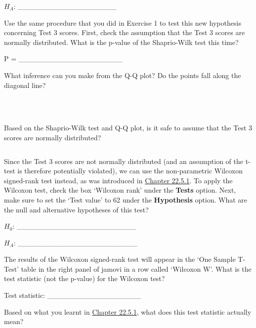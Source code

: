 \documentclass[
]{scrbook}
\begin{document}
\(H_{A}\): \_\_\_\_\_\_\_\_\_\_\_\_\_\_\_\_\_\_\_

Use the same procedure that you did in Exercise 1 to test this new hypothesis concerning Test 3 scores.
First, check the assumption that the Test 3 scores are normally distributed.
What is the p-value of the Shaprio-Wilk test this time?

P = \_\_\_\_\_\_\_\_\_\_\_\_\_\_\_\_\_\_\_\_

What inference can you make from the Q-Q plot?
Do the points fall along the diagonal line?

\begin{verbatim}



\end{verbatim}

Based on the Shaprio-Wilk test and Q-Q plot, is it safe to assume that the Test 3 scores are normally distributed?

\begin{verbatim}

\end{verbatim}

Since the Test 3 scores are not normally distributed (and an assumption of the t-test is therefore potentially violated), we can use the non-parametric Wilcoxon signed-rank test instead, as was introduced in \protect\hyperlink{wilcoxon-test}{Chapter 22.5.1}.
To apply the Wilcoxon test, check the box `Wilcoxon rank' under the \textbf{Tests} option.
Next, make sure to set the `Test value' to 62 under the \textbf{Hypothesis} option.
What are the null and alternative hypotheses of this test?

\(H_{0}\): \_\_\_\_\_\_\_\_\_\_\_\_\_\_\_\_\_\_\_\_\_\_\_

\(H_{A}\): \_\_\_\_\_\_\_\_\_\_\_\_\_\_\_\_\_\_\_\_\_\_\_

The results of the Wilcoxon signed-rank test will appear in the `One Sample T-Test' table in the right panel of jamovi in a row called `Wilcoxon W'.
What is the test statistic (not the p-value) for the Wilcoxon test?

Test statistic: \_\_\_\_\_\_\_\_\_\_\_\_\_\_\_\_\_\_

Based on what you learnt in \protect\hyperlink{wilcoxon-test}{Chapter 22.5.1}, what does this test statistic actually mean?

\begin{verbatim}



\end{verbatim}
\end{document}

